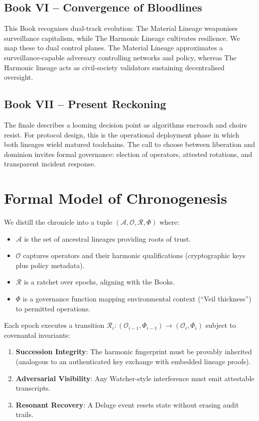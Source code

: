 \documentclass[11pt,a4paper]{article}
\begin{document}
\subsection{Book VI -- Convergence of Bloodlines}
This Book recognises dual-track evolution: The Material Lineage weaponises surveillance capitalism, while The Harmonic Lineage cultivates resilience. We map these to dual control planes. The Material Lineage approximates a surveillance-capable adversary controlling networks and policy, whereas The Harmonic lineage acts as civil-society validators sustaining decentralised oversight.

\subsection{Book VII -- Present Reckoning}
The finale describes a looming decision point as algorithms encroach and choirs resist. For protocol design, this is the operational deployment phase in which both lineages wield matured toolchains. The call to choose between liberation and dominion invites formal governance: election of operators, attested rotations, and transparent incident response.

\section{Formal Model of Chronogenesis}
We distill the chronicle into a tuple $(\mathcal{A}, \mathcal{O}, \mathcal{R}, \Phi)$ where:
\begin{itemize}
    \item $\mathcal{A}$ is the set of ancestral lineages providing roots of trust.
    \item $\mathcal{O}$ captures operators and their harmonic qualifications (cryptographic keys plus policy metadata).
    \item $\mathcal{R}$ is a ratchet over epochs, aligning with the Books.
    \item $\Phi$ is a governance function mapping environmental context (``Veil thickness'') to permitted operations.
\end{itemize}

Each epoch executes a transition $\mathcal{R}_i : (\mathcal{O}_{i-1}, \Phi_{i-1}) \rightarrow (\mathcal{O}_i, \Phi_i)$ subject to covenantal invariants:
\begin{enumerate}
    \item \textbf{Succession Integrity}: The harmonic fingerprint must be provably inherited (analogous to an authenticated key exchange with embedded lineage proofs).
    \item \textbf{Adversarial Visibility}: Any Watcher-style interference must emit attestable transcripts.
    \item \textbf{Resonant Recovery}: A Deluge event resets state without erasing audit trails.
\end{enumerate}
\end{document}
